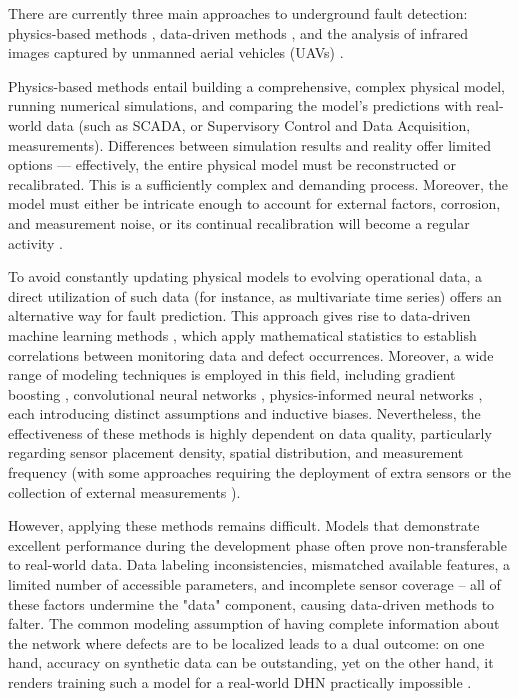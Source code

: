 \documentclass[energies,article,submit,pdftex,moreauthors]{Definitions/mdpi}
\begin{document}
There are currently three main approaches to underground fault detection:
physics-based methods \cite{zheng2021leak}, data-driven methods
\cite{ntakolia2022machine}, and the analysis of infrared images captured by
unmanned aerial vehicles (UAVs) \cite{hossain2020uav}.


Physics-based methods entail building a comprehensive, complex physical model,
running numerical simulations, and comparing the model's predictions with
real-world data (such as SCADA, or Supervisory Control and Data Acquisition,
measurements). Differences between simulation results and reality offer limited
options — effectively, the entire physical model must be reconstructed or recalibrated. This is a sufficiently complex and demanding process. Moreover,
the model must either be intricate enough to account for external factors,
corrosion, and measurement noise, or its continual recalibration will become a
regular activity \cite{yang2014based}.

To avoid constantly updating physical models to evolving operational data, a
direct utilization of such data (for instance, as multivariate time series)
offers an alternative way for fault prediction. This approach gives rise to
data-driven machine learning methods \cite{losi2024data}, which apply
mathematical statistics to establish correlations between monitoring data and
defect occurrences. Moreover, a wide range of modeling techniques is employed
in this field, including gradient boosting \cite{xue2020machine}, convolutional
neural networks \cite{li2020data}, physics-informed neural networks
\cite{de2024physics}, each introducing distinct assumptions and inductive
biases. Nevertheless, the effectiveness of these methods is highly dependent on
data quality, particularly regarding sensor placement density, spatial
distribution, and measurement frequency (with some approaches requiring the
deployment of extra sensors or the collection of external measurements
\cite{qu2010svm}).

However, applying these methods remains difficult. Models that demonstrate
excellent performance during the development phase often prove non-transferable
to real-world data. Data labeling inconsistencies, mismatched available
features, a limited number of accessible parameters, and incomplete sensor
coverage -- all of these factors undermine the "data" component, causing
data-driven methods to falter. The common modeling assumption of having
complete information about the network where defects are to be localized leads
to a dual outcome: on one hand, accuracy on synthetic data can be outstanding,
yet on the other hand, it renders training such a model for a real-world DHN
practically impossible \cite{bode2020real, dorfner2014large, perez2021leak,
	bahlawan2022detection, zhou2022leakage}.
\end{document}
